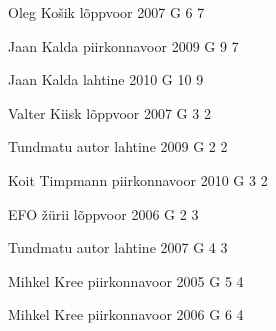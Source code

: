 \documentclass[11pt]{article}
\begin{document}
{Oleg Košik} %
{lõppvoor} %
{2007} %
{G 6} %
{7} %
{

\ifEngHint
\fi
}

{Jaan Kalda} %
{piirkonnavoor} %
{2009} %
{G 9} %
{7} %
{

\ifEngHint
\fi
}

{Jaan Kalda} %
{lahtine} %
{2010} %
{G 10} %
{9} %
{

\ifEngHint
\fi
}

{Valter Kiisk} %
{lõppvoor} %
{2007} %
{G 3} %
{2} %
{

\ifEngHint
\fi
}

{Tundmatu autor} %
{lahtine} %
{2009} %
{G 2} %
{2} %
{

\ifEngHint
\fi
}

{Koit Timpmann} %
{piirkonnavoor} %
{2010} %
{G 3} %
{2} %
{

\ifEngHint
\fi
}

{EFO žürii} %
{lõppvoor} %
{2006} %
{G 2} %
{3} %
{

\ifEngHint
\fi
}

{Tundmatu autor} %
{lahtine} %
{2007} %
{G 4} %
{3} %
{

\ifEngHint
\fi
}

{Mihkel Kree} %
{piirkonnavoor} %
{2005} %
{G 5} %
{4} %
{

\ifEngHint
\fi
}

{Mihkel Kree} %
{piirkonnavoor} %
{2006} %
{G 6} %
{4} %
{

\ifEngHint
\fi
}
\end{document}
